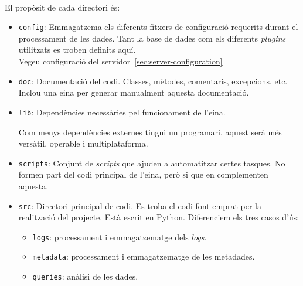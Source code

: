 \noindent \\
El propòsit de cada directori és:

\begin{itemize}
    \item \texttt{config}: Emmagatzema els diferents fitxers de configuració requerits durant el processament de les dades.
    Tant la base de dades com els diferents \textit{\gls{plugin}s} utilitzats es troben definits aquí. \\
    Vegeu configuració del servidor~\ref{sec:server-configuration}
    \item \texttt{doc}: Documentació del codi.
    Classes, mètodes, comentaris, excepcions, etc.
    Inclou una eina per generar manualment aquesta documentació.
    \item \texttt{lib}: Dependències necessàries pel funcionament de l'eina.
    \begin{tcolorbox}[colback=blue!5!white, colframe=blue!75!black, title=Interoperabilitat]
        Com menys dependències externes tingui un programari, aquest serà més versàtil, operable i multiplataforma.
    \end{tcolorbox}
    \item \texttt{scripts}: Conjunt de \textit{scripts} que ajuden a automatitzar certes tasques.
    No formen part del codi principal de l'eina, però si que en complementen aquesta.
    \item \texttt{src}: Directori principal de codi.
    Es troba el codi font emprat per la realització del projecte.
    Està escrit en Python.
    Diferenciem els tres casos d'ús:
    \begin{itemize}
        \item \texttt{logs}: processament i emmagatzematge dels \textit{logs}.
        \item \texttt{metadata}: processament i emmagatzematge de les metadades.
        \item \texttt{queries}: anàlisi de les dades.
    \end{itemize}
\end{itemize}

